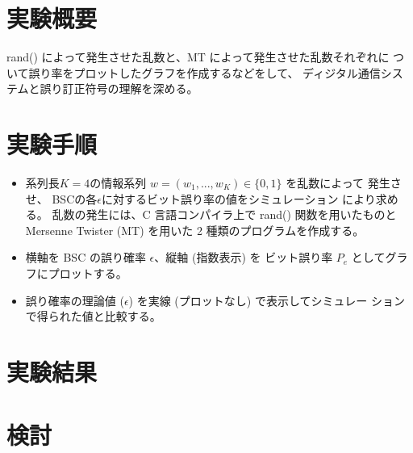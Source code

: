 \documentclass[12pt]{jarticle}
\begin{document}



\section{実験概要}
rand() によって発生させた乱数と、MT によって発生させた乱数それぞれに
ついて誤り率をプロットしたグラフを作成するなどをして、
ディジタル通信システムと誤り訂正符号の理解を深める。

\section{実験手順}
\begin{itemize}
    \item 系列長$K=4$の情報系列
          $w=(w_1,...,w_K) \in \{0,1\}$ を乱数によって
          発生させ、
          BSCの各$\epsilon$に対するビット誤り率の値をシミュレーション
          により求める。
          乱数の発生には、C 言語コンパイラ上で rand() 関数を用いたものと
          Mersenne Twister (MT) を用いた 2 種類のプログラムを作成する。
    \item 横軸を BSC の誤り確率 $\epsilon$、縦軸 (指数表示) を
          ビット誤り率 $P_e$ としてグラフにプロットする。
    \item 誤り確率の理論値 ($\epsilon$) を実線 (プロットなし) で表示してシミュレー
          ションで得られた値と比較する。
\end{itemize}

\section{実験結果}
\section{検討}
\end{document}
